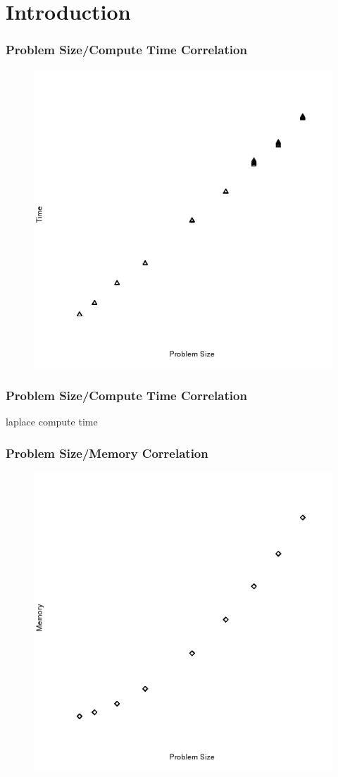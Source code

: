 

\section{Introduction}

\begin{frame}
		\frametitle{Problem Size/Compute Time Correlation}
			\begin{figure}
					\includegraphics[width=0.65\linewidth]{figures/time/linpack}
			\end{figure}
\end{frame}

\begin{frame}
		\frametitle{Problem Size/Compute Time Correlation}
		laplace compute time
\end{frame}

\begin{frame}
		\frametitle{Problem Size/Memory Correlation}
			\begin{figure}
					\includegraphics[width=0.65\linewidth]{figures/memory/linpack}
			\end{figure}
\end{frame}

